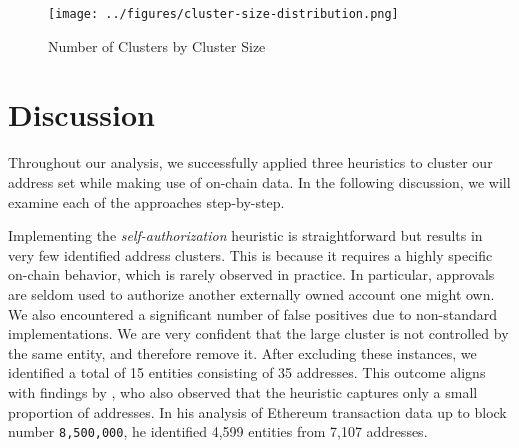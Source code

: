 \documentclass[12pt,a4paper,titlepage,oneside,english]{article}
\begin{document}
\begin{figure}[h]
	\centering
	\texttt{[image: ../figures/cluster-size-distribution.png]}
	\caption{Number of Clusters by Cluster Size}
	\label{fig:barplot_clusters}
\end{figure}



\section{Discussion}
Throughout our analysis, we successfully applied three heuristics to cluster our address set while making use of on-chain data. In the following discussion, we will examine each of the approaches step-by-step.

Implementing the \textit{self-authorization} heuristic is straightforward but results in very few identified address clusters. This is because it requires a highly specific on-chain behavior, which is rarely observed in practice. In particular, approvals are seldom used to authorize another externally owned account one might own. We also encountered a significant number of false positives due to non-standard implementations. We are very confident that the large cluster is not controlled by the same entity, and therefore remove it. After excluding these instances, we identified a total of 15 entities consisting of 35 addresses. This outcome aligns with findings by \cite{FV:17}, who also observed that the heuristic captures only a small proportion of addresses. In his analysis of Ethereum transaction data up to block number \texttt{8,500,000}, he identified 4,599 entities from 7,107 addresses.
\end{document}
